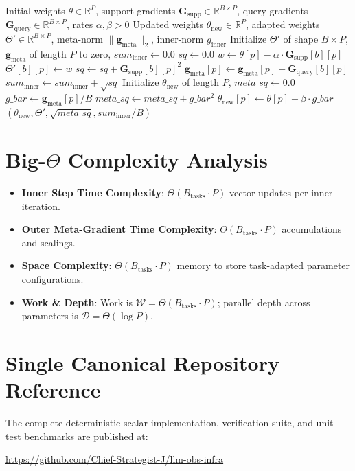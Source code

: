 \documentclass[11pt,a4paper]{article}
\theoremstyle{definition}
\begin{document}
\begin{algorithm}[H]
\caption{Model-Agnostic Meta-Learning First-Order Update Pipeline}
\begin{algorithmic}[1]
\Require Initial weights $\theta \in \mathbb{R}^P$, support gradients $\mathbf{G}_{\text{supp}} \in \mathbb{R}^{B \times P}$, query gradients $\mathbf{G}_{\text{query}} \in \mathbb{R}^{B \times P}$, rates $\alpha, \beta > 0$
\Ensure Updated weights $\theta_{\text{new}} \in \mathbb{R}^P$, adapted weights $\Theta' \in \mathbb{R}^{B \times P}$, meta-norm $\|\mathbf{g}_{\text{meta}}\|_2$, inner-norm $\bar{g}_{\text{inner}}$
\State Initialize $\Theta'$ of shape $B \times P$, $\mathbf{g}_{\text{meta}}$ of length $P$ to zero, $sum_{\text{inner}} \gets 0.0$
    \State $sq \gets 0.0$
        \State $w \gets \theta[p] - \alpha \cdot \mathbf{G}_{\text{supp}}[b][p]$
        \State $\Theta'[b][p] \gets w$
        \State $sq \gets sq + \mathbf{G}_{\text{supp}}[b][p]^2$
        \State $\mathbf{g}_{\text{meta}}[p] \gets \mathbf{g}_{\text{meta}}[p] + \mathbf{G}_{\text{query}}[b][p]$
    \EndFor
    \State $sum_{\text{inner}} \gets sum_{\text{inner}} + \sqrt{sq}$
\EndFor
\State Initialize $\theta_{\text{new}}$ of length $P$, $meta\_sq \gets 0.0$
    \State $g\_bar \gets \mathbf{g}_{\text{meta}}[p] / B$
    \State $meta\_sq \gets meta\_sq + g\_bar^2$
    \State $\theta_{\text{new}}[p] \gets \theta[p] - \beta \cdot g\_bar$
\EndFor
\State \Return $(\theta_{\text{new}}, \Theta', \sqrt{meta\_sq}, sum_{\text{inner}} / B)$
\end{algorithmic}
\end{algorithm}

\section{Big-$\Theta$ Complexity Analysis}

\begin{itemize}
    \item \textbf{Inner Step Time Complexity}: $\Theta(B_{\text{tasks}} \cdot P)$ vector updates per inner iteration.
    \item \textbf{Outer Meta-Gradient Time Complexity}: $\Theta(B_{\text{tasks}} \cdot P)$ accumulations and scalings.
    \item \textbf{Space Complexity}: $\Theta(B_{\text{tasks}} \cdot P)$ memory to store task-adapted parameter configurations.
    \item \textbf{Work \& Depth}: Work is $\mathcal{W} = \Theta(B_{\text{tasks}} \cdot P)$; parallel depth across parameters is $\mathcal{D} = \Theta(\log P)$.
\end{itemize}

\section{Single Canonical Repository Reference}

The complete deterministic scalar implementation, verification suite, and unit test benchmarks are published at:
\begin{center}
\url{https://github.com/Chief-Strategist-J/llm-obs-infra}
\end{center}
\end{document}
